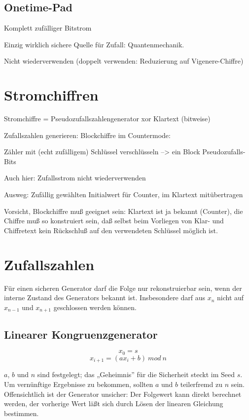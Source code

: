 \section{Onetime-Pad}

Komplett zufälliger Bitstrom

Einzig wirklich sichere Quelle für Zufall: Quantenmechanik.

Nicht wiederverwenden (doppelt verwenden: Reduzierung auf Vigenere-Chiffre)


\chapter{Stromchiffren}

Stromchiffre = Pseudozufallszahlengenerator xor Klartext (bitweise)

Zufallszahlen generieren: Blockchiffre im Countermode:

Zähler mit (echt zufälligem) Schlüssel verschlüsseln --> ein Block Pseudozufalls-Bits

Auch hier: Zufallsstrom nicht wiederverwenden

Ausweg: Zufällig gewählten Initialwert für Counter, im Klartext mitübertragen

Vorsicht, Blockchiffre muß geeignet sein: Klartext ist ja bekannt (Counter), die Chiffre muß so konstruiert sein, daß selbst beim Vorliegen von Klar- und Chiffretext kein Rückschluß auf den verwendeten Schlüssel möglich ist.


\chapter{Zufallszahlen}

Für einen sicheren Generator darf die Folge nur rekonstruierbar sein, wenn der interne Zustand des Generators bekannt ist. Insbesondere darf aus $x_n$ nicht auf $x_{n-1}$ und $x_{n+1}$ geschlossen werden können.

\section{Linearer Kongruenzgenerator}

$$x_0 = s $$
$$x_{i+1} = (a x_i + b)\ mod\ n$$

$a$, $b$ und $n$ sind festgelegt; das „Geheimnis” für die Sicherheit steckt im Seed $s$. Um vernünftige Ergebnisse zu bekommen, sollten $a$ und $b$ teilerfremd zu $n$ sein. Offensichtlich ist der Generator unsicher: Der Folgewert kann direkt berechnet werden, der vorherige Wert läßt sich durch Lösen der linearen Gleichung bestimmen.

